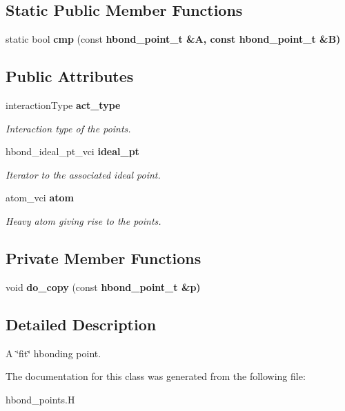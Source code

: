 \subsection*{Static Public Member Functions}
\begin{CompactItemize}
\item 
static bool \textbf{cmp} (const \bf{hbond\_\-point\_\-t} \&A, const \bf{hbond\_\-point\_\-t} \&B)\label{classSimSite3D_1_1hbond__point__t_86692805c3b0ded25d5e64a74fb8089f}

\end{CompactItemize}
\subsection*{Public Attributes}
\begin{CompactItemize}
\item 
interaction\-Type \bf{act\_\-type}\label{classSimSite3D_1_1hbond__point__t_64018d64558cbf939525efb893679809}

\begin{CompactList}\small\item\em Interaction type of the points. \item\end{CompactList}\item 
hbond\_\-ideal\_\-pt\_\-vci \bf{ideal\_\-pt}\label{classSimSite3D_1_1hbond__point__t_9ba48d24b24579d4e3a810af1fc57453}

\begin{CompactList}\small\item\em Iterator to the associated ideal point. \item\end{CompactList}\item 
atom\_\-vci \bf{atom}\label{classSimSite3D_1_1hbond__point__t_efd938fefea14539848e466c7f08d325}

\begin{CompactList}\small\item\em Heavy atom giving rise to the points. \item\end{CompactList}\end{CompactItemize}
\subsection*{Private Member Functions}
\begin{CompactItemize}
\item 
void \textbf{do\_\-copy} (const \bf{hbond\_\-point\_\-t} \&p)\label{classSimSite3D_1_1hbond__point__t_ac9aceb4f7f609deebb437ec14b8b15a}

\end{CompactItemize}


\subsection{Detailed Description}
A \char`\"{}fit\char`\"{} hbonding point. 



The documentation for this class was generated from the following file:\begin{CompactItemize}
\item 
hbond\_\-points.H\end{CompactItemize}
